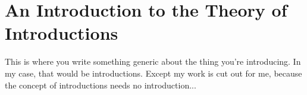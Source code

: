 
\chapter{An Introduction to the Theory of Introductions} \label{Ch1:CH}
\thispagestyle{empty}

This is where you write something generic about the thing you're introducing. In my case, that would be introductions. Except my work is cut out for me, because the concept of introductions needs no introduction...


